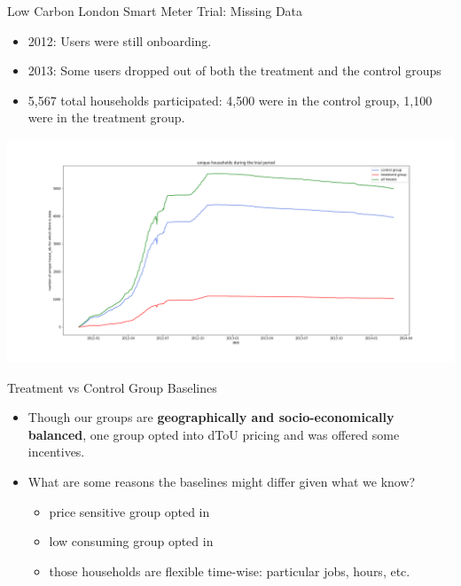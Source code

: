 \documentclass{beamer}
\begin{document}
\begin{frame}{Low Carbon London Smart Meter Trial: Missing Data}
  \begin{itemize}
    \item 2012: Users were still onboarding.
    \item 2013: Some users dropped out of both the treatment and the control groups
    \item 5,567 total households participated: 4,500 were in the control group, 1,100 were in the treatment group.
  \end{itemize}
  \vspace{-0.5cm}
  \includegraphics[width=1\textwidth]{images/house-count.png}
\end{frame}

\begin{frame}{Treatment vs Control Group Baselines}
  \begin{itemize}
    \item<+-> Though our groups are \textbf{geographically and socio-economically balanced}, one group opted into dToU pricing and was offered some incentives.
    \item<+-> What are some reasons the baselines might differ given what we know?
    \begin{itemize}
      \item<+-> price sensitive group opted in
      \item<+-> low consuming group opted in
      \item<+-> those households are flexible time-wise: particular jobs, hours, etc.
    \end{itemize}
  \end{itemize}
\end{frame}
\end{document}
